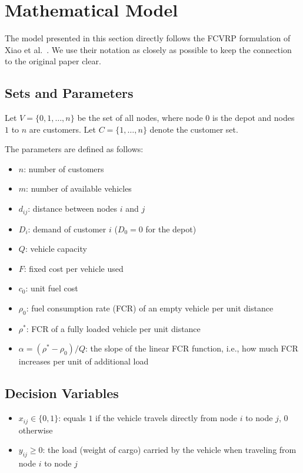 \documentclass [a4paper, 11pt, titlepage] {article}
\begin{document}
\section{Mathematical Model}
\label{sec:model}

The model presented in this section directly follows the FCVRP formulation of Xiao et al.\ \cite{xiao2012}. We use their notation as closely as possible to keep the connection to the original paper clear.

\subsection{Sets and Parameters}

Let $V = \{0, 1, \ldots, n\}$ be the set of all nodes, where node $0$ is the depot and nodes $1$ to $n$ are customers. Let $C = \{1, \ldots, n\}$ denote the customer set.

The parameters are defined as follows:

\begin{itemize}
    \item $n$: number of customers
    \item $m$: number of available vehicles
    \item $d_{ij}$: distance between nodes $i$ and $j$
    \item $D_i$: demand of customer $i$ ($D_0 = 0$ for the depot)
    \item $Q$: vehicle capacity
    \item $F$: fixed cost per vehicle used
    \item $c_0$: unit fuel cost
    \item $\rho_0$: fuel consumption rate (FCR) of an empty vehicle per unit distance
    \item $\rho^*$: FCR of a fully loaded vehicle per unit distance
    \item $\alpha = (\rho^* - \rho_0)/Q$: the slope of the linear FCR function, i.e., how much FCR increases per unit of additional load
\end{itemize}

\subsection{Decision Variables}

\begin{itemize}
    \item $x_{ij} \in \{0,1\}$: equals $1$ if the vehicle travels directly from node $i$ to node $j$, $0$ otherwise
    \item $y_{ij} \geq 0$: the load (weight of cargo) carried by the vehicle when traveling from node $i$ to node $j$
\end{itemize}
\end{document}
